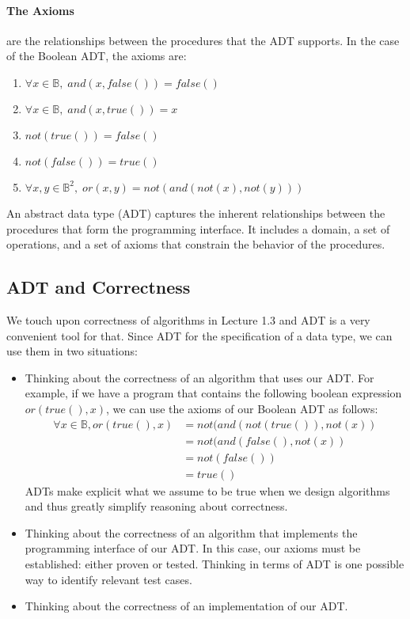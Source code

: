 \documentclass{aldast}
\begin{document}
\paragraph{The Axioms} are the relationships between the procedures
that the ADT supports. In the case of the Boolean ADT, the axioms are:
\begin{enumerate}
\item $\forall x \in \mathbb{B}, \; and(x, false()) = false()$
\item $\forall x \in \mathbb{B}, \; and(x, true()) = x$
\item $not(true()) = false()$
\item $not(false()) = true()$
\item $\forall x,y \in \mathbb{B}^2, \; or(x, y) = not(and(not(x), not(y)))$
\end{enumerate}

\begin{takeaway}
  An abstract data type (ADT) captures the inherent relationships
  between the procedures that form the programming interface. It
  includes a domain, a set of operations, and a set of axioms that
  constrain the behavior of the procedures.
\end{takeaway}

\subsection{ADT and Correctness}

We touch upon correctness of algorithms in Lecture 1.3 and ADT is a
very convenient tool for that. Since ADT for the specification of a
data type, we can use them in two situations:
\begin{itemize}
\item Thinking about the correctness of an algorithm that uses our
  ADT. For example, if we have a program that contains the following
  boolean expression $or(true(), x)$, we can use the axioms of our
  Boolean ADT as follows:
  \begin{align*}
    \forall x \in \mathbb{B}, or(true(), x) &= not(and(not(true()), not(x)) \tag{Axiom 5} \\
                                            &= not(and(false(), not(x)) \tag{Axiom 3} \\
                                            &= not(false()) \tag{Axiom 1} \\
                                            &= true() \tag{Axiom 4}
  \end{align*}
  ADTs make explicit what we assume to be true when we design
  algorithms and thus greatly simplify reasoning about correctness.
\item Thinking about the correctness of an algorithm that implements
  the programming interface of our ADT. In this case, our axioms must
  be established: either proven or tested. Thinking in terms of ADT is
  one possible way to identify relevant test cases.
  
\item Thinking about the correctness of an implementation of our ADT.
\end{itemize}
\end{document}
